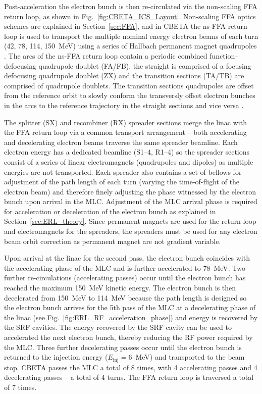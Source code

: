 \documentclass[../main.tex]{subfiles}
\begin{document}
Post-acceleration the electron bunch is then re-circulated via the non-scaling FFA return loop, as shown in Fig.~\ref{fig:CBETA_ICS_Layout}. Non-scaling FFA optics schemes are explained in Section~\ref{sec:FFA}, and in CBETA the ns-FFA return loop is used to transport the multiple nominal energy electron beams of each turn (42, 78, 114, 150~\si{\mega\electronvolt}) using a series of Hallbach permanent magnet quadrupoles \cite{brooks2020permanent}. The arcs of the ns-FFA return loop contain a periodic combined function--defocusing quadrupole doublet (FA/FB), the straight is comprised of a focusing--defocusing quadrupole doublet (ZX) and the transition sections (TA/TB) are comprised of quadrupole doublets. The transition sections quadrupoles are offset from the reference orbit to slowly conform the transversly offset electron bunches in the arcs to the reference trajectory in the straight sections and vice versa \cite{hoffstaetter2017cbeta}. 

The splitter (SX) and recombiner (RX) spreader sections merge the linac with the FFA return loop via a common transport arrangement -- both accelerating and decelerating electron beams traverse the same spreader beamline. Each electron energy has a dedicated beamline (S1--4, R1--4) so the spreader sections consist of a series of linear electromagnets (quadrupoles and dipoles) as multiple energies are not transported. Each spreader also contains a set of bellows for adjustment of the path length of each turn (varying the time-of-flight of the electron beam) and therefore finely adjusting the phase witnessed by the electron bunch upon arrival in the MLC. Adjustment of the MLC arrival phase is required for acceleration or deceleration of the electron bunch as explained in Section~\ref{sec:ERL_theory}. Since permanent magnets are used for the return loop and electromagnets for the spreaders, the spreaders must be used for any electron beam orbit correction as permanent magnet are not gradient variable.

Upon arrival at the linac for the second pass, the electron bunch coincides with the accelerating phase of the MLC and is further accelerated to 78~\si{\mega\electronvolt}. Two further re-circulations (accelerating passes) occur until the electron bunch has reached the maximum 150~\si{\mega\electronvolt} kinetic energy. The electron bunch is then decelerated from 150~\si{\mega\electronvolt} to 114~\si{\mega\electronvolt} because the path length is designed so the electron bunch arrives for the 5th pass of the MLC at a decelerating phase of the linac (see Fig.~\ref{fig:ERL_RF_acceleration_phase}) and energy is recovered by the SRF cavities. The energy recovered by the SRF cavity can be used to accelerated the next electron bunch, thereby reducing the RF power required by the MLC. Three further decelerating passes occur until the electron bunch is returned to the injection energy ($E_{\mathrm{inj}} = 6$~\si{\mega\electronvolt}) and transported to the beam stop. CBETA passes the MLC a total of 8 times, with 4 accelerating passes and 4 decelerating passes -- a total of 4 turns. The FFA return loop is traversed a total of 7 times.
\end{document}
